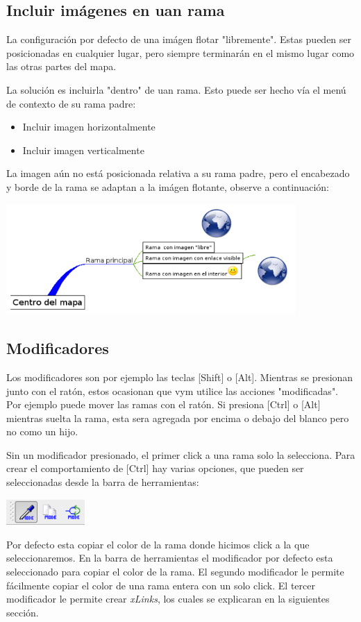 \documentclass{article}
\newcommand{\vym}{{\sc vym }}
\newcommand{\key}[1]{[#1]}
\begin{document}
\subsection{Incluir im\'agenes en uan rama} 
La configuraci\'on por defecto de una im\'agen flotar "libremente". Estas pueden ser
posicionadas en cualquier lugar, pero siempre terminar\'an en el mismo lugar como
las otras partes del mapa.

La soluci\'on es incluirla "dentro" de uan rama. Esto puede ser hecho v\'ia
el men\'u de contexto de su rama padre:
\begin{itemize}
    \item Incluir imagen horizontalmente
    \item Incluir imagen verticalmente
\end{itemize}
La imagen a\'un no est\'a posicionada relativa a su rama padre, pero el
encabezado y borde de la rama se adaptan a la im\'agen flotante, observe a continuaci\'on:
\begin{center}
    \includegraphics[width=11cm]{images/includeImages_es.png}
\end{center}

\subsection{Modificadores} 
Los modificadores son por ejemplo las teclas \key{Shift} o \key{Alt}. Mientras se presionan junto con el rat\'on, estos ocasionan que \vym utilice las acciones "modificadas". Por ejemplo puede mover las ramas con el rat\'on. Si presiona \key{Ctrl} o \key{Alt} mientras suelta la rama, esta sera agregada por encima o debajo del blanco pero no como un hijo.

Sin un modificador presionado, el primer click a una rama solo la selecciona. Para crear el comportamiento de \key{Ctrl} hay varias opciones, que pueden ser seleccionadas desde la barra de herramientas:


\begin{center}
    \includegraphics[width=3cm]{images/modmodes.png}
\end{center}
Por defecto esta copiar el color de la rama donde hicimos click a la que seleccionaremos. En la barra de herramientas el modificador por defecto esta seleccionado para copiar el color de la rama.  El segundo modificador le permite f\'acilmente copiar el color de una rama entera con un solo click. El tercer modificador le permite crear {\em xLinks}, los cuales se explicaran en la siguientes secci\'on.
\end{document}
